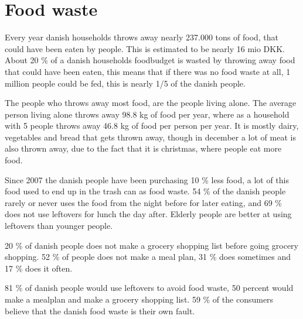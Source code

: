 \section{Food waste}
Every year danish households throws away nearly 237.000 tons of food, that could have been eaten by people. This is estimated to be nearly 16 mio DKK. About 20 \% of a danish households foodbudget is wasted by throwing away food that could have been eaten, this means that if there was no food waste at all, 1 million people could be fed, this is nearly 1/5 of the danish people.

The people who throws away most food, are the people living alone. The average person living alone throws away 98.8 kg of food per year, where as a household with 5 people throws away 46.8 kg of food per person per year. It is mostly dairy, vegetables and bread that gets thrown away, though in december a lot of meat is also thrown away, due to the fact that it is christmas, where people eat more food.

Since 2007 the danish people have been purchasing 10 \% less food, a lot of this food used to end up in the trash can as food waste. 54 \% of the danish people rarely or never uses the food from the night before for later eating, and 69 \% does not use leftovers for lunch the day after. Elderly people are better at using leftovers than younger people. 

20 \% of danish people does not make a grocery shopping list before going grocery shopping. 52 \% of people does not make a meal plan, 31 \% does sometimes and 17 \% does it often.

81 \% of danish people would use leftovers to avoid food waste, 50 percent would make a mealplan and make a grocery shopping list. 59 \% of the consumers believe that the danish food waste is their own fault.
